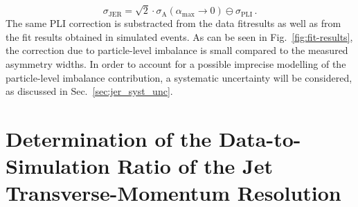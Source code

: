 \begin{equation}
\sigma_\mathrm{JER} =  \sqrt{2} \cdot \sigma_\mathrm{A}(\alpha_\mathrm{max} \rightarrow 0) \ominus \sigma_\mathrm{PLI} \, .
\end{equation}  
The same PLI correction is substracted from the data fitresults as well as from the fit results obtained in simulated events. As can be seen in Fig.~\ref{fig:fit-results}, the correction due to particle-level imbalance is small compared to the measured asymmetry widths. In order to account for a possible imprecise modelling of the particle-level imbalance contribution, a systematic uncertainty will be considered, as discussed in Sec.~\ref{sec:jer_syst_unc}.

\section[Determination of the Data-to-Simulation Ratio]{Determination of the Data-to-Simulation Ratio of the Jet Transverse-Momentum Resolution}
\label{sec:jer_ratio_determination}
